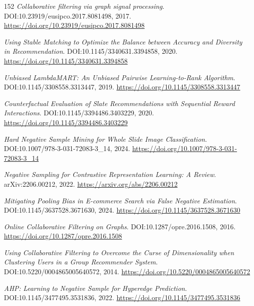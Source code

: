 \documentclass[11pt,a4paper]{article}
\begin{document}
\begin{thebibliography}{152}
\newblock \emph{Collaborative filtering via graph signal processing}.
\newblock DOI:10.23919/eusipco.2017.8081498, 2017.
\newblock \url{https://doi.org/10.23919/eusipco.2017.8081498}

\newblock \emph{Using Stable Matching to Optimize the Balance between Accuracy and Diversity in Recommendation}.
\newblock DOI:10.1145/3340631.3394858, 2020.
\newblock \url{https://doi.org/10.1145/3340631.3394858}

\newblock \emph{Unbiased LambdaMART: An Unbiased Pairwise Learning-to-Rank Algorithm}.
\newblock DOI:10.1145/3308558.3313447, 2019.
\newblock \url{https://doi.org/10.1145/3308558.3313447}

\newblock \emph{Counterfactual Evaluation of Slate Recommendations with Sequential Reward Interactions}.
\newblock DOI:10.1145/3394486.3403229, 2020.
\newblock \url{https://doi.org/10.1145/3394486.3403229}

\newblock \emph{Hard Negative Sample Mining for Whole Slide Image Classification}.
\newblock DOI:10.1007/978-3-031-72083-3\_14, 2024.
\newblock \url{https://doi.org/10.1007/978-3-031-72083-3_14}

\newblock \emph{Negative Sampling for Contrastive Representation Learning: A Review}.
\newblock arXiv:2206.00212, 2022.
\newblock \url{https://arxiv.org/abs/2206.00212}

\newblock \emph{Mitigating Pooling Bias in E-commerce Search via False Negative Estimation}.
\newblock DOI:10.1145/3637528.3671630, 2024.
\newblock \url{https://doi.org/10.1145/3637528.3671630}

\newblock \emph{Online Collaborative Filtering on Graphs}.
\newblock DOI:10.1287/opre.2016.1508, 2016.
\newblock \url{https://doi.org/10.1287/opre.2016.1508}

\newblock \emph{Using Collaborative Filtering to Overcome the Curse of Dimensionality when Clustering Users in a Group Recommender System}.
\newblock DOI:10.5220/0004865005640572, 2014.
\newblock \url{https://doi.org/10.5220/0004865005640572}

\newblock \emph{AHP: Learning to Negative Sample for Hyperedge Prediction}.
\newblock DOI:10.1145/3477495.3531836, 2022.
\newblock \url{https://doi.org/10.1145/3477495.3531836}

\end{thebibliography}
\end{document}
